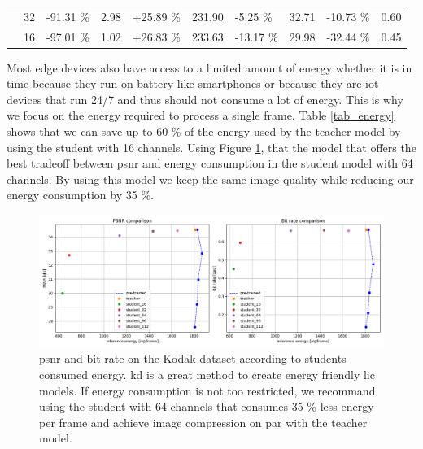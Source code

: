 \documentclass{article}
\begin{document}
\begin{table}[]
\begin{tabular}{|c|c|lr|lr|lr|lr|}
                             & 32                                                           & {\color[HTML]{656565} -91.31 \%}                       & 2.98                                              & {\color[HTML]{656565} +25.89 \%}            & 231.90 & {\color[HTML]{656565} -5.25 \%}  & 32.71 & {\color[HTML]{656565} -10.73 \%} & 0.60 \\ \cline{2-10}
                             & 16                                                           & {\color[HTML]{656565} -97.01 \%}                       & 1.02                                              & {\color[HTML]{656565} +26.83 \%}            & 233.63 & {\color[HTML]{656565} -13.17 \%} & 29.98 & {\color[HTML]{656565} -32.44 \%} & 0.45 \\ \hline
    \end{tabular}
\end{table}

Most edge devices also have access to a limited amount of energy whether it is in time because they run on battery like smartphones or because they are \acrfull{iot} devices that run 24/7 and thus should not consume a lot of energy. This is why we focus on the energy required to process a single frame. Table \ref{tab_energy} shows that we can save up to 60 \% of the energy used by the teacher model by using the student with 16 channels. Using Figure \ref{kd_lic_energy}, that the model that offers the best tradeoff between \acrshort{psnr} and energy consumption in the student model with 64 channels. By using this model we keep the same image quality while reducing our energy consumption by 35 \%.

\begin{figure}
    \centering
    \includegraphics[width=15cm]{../img/kd_lic_energy.png}
    \caption[\acrshort{psnr} and bit rate on the Kodak dataset according to students consumed energy.]{\acrshort{psnr} and bit rate on the Kodak dataset according to students consumed energy. \acrshort{kd} is a great method to create energy friendly \acrshort{lic} models. If energy consumption is not too restricted, we recommand using the student with 64 channels that consumes 35 \% less energy per frame and achieve image compression on par with the teacher model.}
    \label{kd_lic_energy}
\end{figure}
\end{document}
